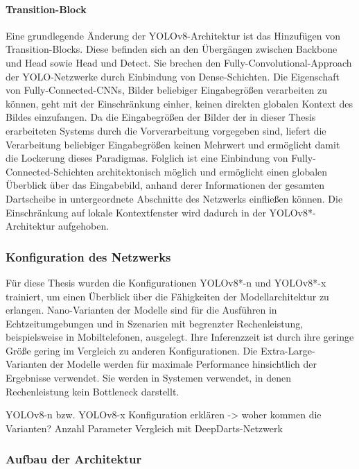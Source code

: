 \paragraph{Transition-Block}

Eine grundlegende Änderung der YOLOv8-Architektur ist das Hinzufügen von Transition-Blocks. Diese befinden sich an den Übergängen zwischen Backbone und Head sowie Head und Detect. Sie brechen den Fully-Convolutional-Approach der YOLO-Netzwerke durch Einbindung von Dense-Schichten. Die Eigenschaft von Fully-Connected-CNNs, Bilder beliebiger Eingabegrößen verarbeiten zu können, geht mit der Einschränkung einher, keinen direkten globalen Kontext des Bildes einzufangen. Da die Eingabegrößen der Bilder der in dieser Thesis erarbeiteten Systems durch die Vorverarbeitung vorgegeben sind, liefert die Verarbeitung beliebiger Eingabegrößen keinen Mehrwert und ermöglicht damit die Lockerung dieses Paradigmas. Folglich ist eine Einbindung von Fully-Connected-Schichten architektonisch möglich und ermöglicht einen globalen Überblick über das Eingabebild, anhand derer Informationen der gesamten Dartscheibe in untergeordnete Abschnitte des Netzwerks einfließen können. Die Einschränkung auf lokale Kontextfenster wird dadurch in der YOLOv8*-Architektur aufgehoben.

\subsubsection{Konfiguration des Netzwerks}

Für diese Thesis wurden die Konfigurationen YOLOv8*-n und YOLOv8*-x trainiert, um einen Überblick über die Fähigkeiten der Modellarchitektur zu erlangen. Nano-Varianten der Modelle sind für die Ausführen in Echtzeitumgebungen und in Szenarien mit begrenzter Rechenleistung, beispielsweise in Mobiltelefonen, ausgelegt. Ihre Inferenzzeit ist durch ihre geringe Größe gering im Vergleich zu anderen Konfigurationen. Die Extra-Large-Varianten der Modelle werden für maximale Performance hinsichtlich der Ergebnisse verwendet. Sie werden in Systemen verwendet, in denen Rechenleistung kein Bottleneck darstellt.


YOLOv8-n bzw. YOLOv8-x
Konfiguration erklären -> woher kommen die Varianten?
Anzahl Parameter
Vergleich mit DeepDarts-Netzwerk

\subsubsection{Aufbau der Architektur}

